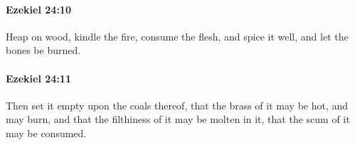 		\paragraph{Ezekiel 24:10} %
			\label{EZEKIEL-24-10}

			Heap on wood, kindle the fire, consume the flesh, and spice it well, and let the bones be burned.


		\paragraph{Ezekiel 24:11} %
			\label{EZEKIEL-24-11}

			Then set it empty upon the coals thereof, that the brass of it may be hot, and may burn, and that the filthiness of it may be molten in it, that the scum of it may be consumed.


